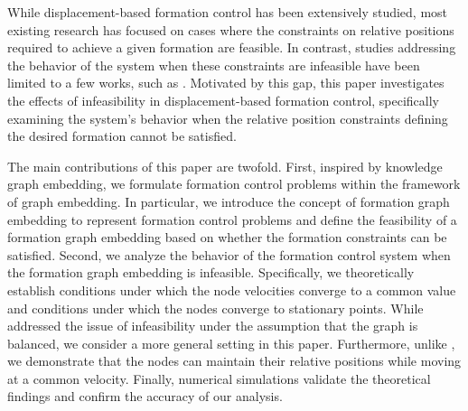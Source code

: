 \documentclass{ifacconf}
\begin{document}
While displacement-based formation control has been extensively studied, most existing research has focused on cases where the constraints on relative positions required to achieve a given formation are feasible. In contrast, studies addressing the behavior of the system when these constraints are infeasible have been limited to a few works, such as \cite{dimarogonas2007further, dimarogonas2008connection}. Motivated by this gap, this paper investigates the effects of infeasibility in displacement-based formation control, specifically examining the system's behavior when the relative position constraints defining the desired formation cannot be satisfied.

The main contributions of this paper are twofold. First, inspired by knowledge graph embedding, we formulate formation control problems within the framework of graph embedding. In particular, we introduce the concept of formation graph embedding to represent formation control problems and define the feasibility of a formation graph embedding based on whether the formation constraints can be satisfied. Second, we analyze the behavior of the formation control system when the formation graph embedding is infeasible. Specifically, we theoretically establish conditions under which the node velocities converge to a common value and conditions under which the nodes converge to stationary points. While \cite{dimarogonas2007further, dimarogonas2008connection} addressed the issue of infeasibility under the assumption that the graph is balanced, we consider a more general setting in this paper. Furthermore, unlike \cite{dimarogonas2007further, dimarogonas2008connection}, we demonstrate that the nodes can maintain their relative positions while moving at a common velocity. Finally, numerical simulations validate the theoretical findings and confirm the accuracy of our analysis.

\end{document}
